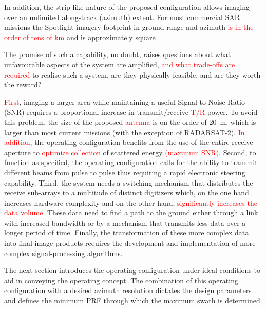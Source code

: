 \documentclass[journal]{IEEEtran}
\newcommand{\cg}[1]{\textcolor{red}{#1}}
\begin{document}
\par
In addition, the strip-like nature of the proposed configuration allows imaging over an unlimited along-track (azimuth) extent. For most commercial SAR missions the Spotlight imagery footprint in ground-range and azimuth \cg{is in the order of tens of km} and is approximately square \cite{Mittermayer}. 
\par
The promise of such a capability, no doubt, raises questions about what unfavourable aspects of the system are amplified, \cg{and what trade-offs are required} to realise such a system, are they physically feasible, and are they worth the reward? 
\par
\cg{First}, imaging a larger area while maintaining a useful Signal-to-Noise Ratio (SNR) requires a proportional increase in transmit/receive \cg{T/R} power. To avoid this problem, the size of the proposed \cg{antenna} is on the order of 20~m, which is larger than most current missions (with the exception of RADARSAT-2). \cg{In addition}, the operating configuration benefits from the use of the entire receive aperture to \cg{optimize collection} of scattered energy \cg{(maximum SNR)}. Second, to function as specified, the operating configuration calls for the ability to transmit different beams from pulse to pulse thus requiring a rapid electronic steering capability. Third, the system needs a switching mechanism that distributes the receive sub-arrays to a multitude of distinct digitizers which, on the one hand increases hardware complexity and on the other hand, \cg{significantly increases the data volume}. These data need to find a path to the ground either through a link with increased bandwidth or by a mechanism that transmits less data over a longer period of time. Finally, the transformation of these more complex data into final image products requires the development and implementation of more complex signal-processing algorithms.
\par
The next section introduces the operating configuration under ideal conditions to aid in conveying the operating concept. The combination of this operating configuration with a desired azimuth resolution dictates the design parameters and defines the minimum PRF through which the maximum swath is determined.


\end{document}
